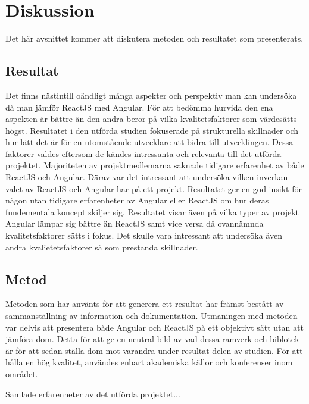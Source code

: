 \section{Diskussion}
\label{sec:axel-discussion}
Det här avsnittet kommer att diskutera metoden och resultatet som presenterats. 

\subsection{Resultat}
\label{subsec:axel-discussion-results}
Det finns nästintill oändligt många aspekter och perspektiv man kan undersöka då man jämför ReactJS med Angular. För att bedömma hurvida den ena aspekten är bättre än den andra beror på vilka kvalitetsfaktorer som värdesätts högst. Resultatet i den utförda studien fokuserade på strukturella skillnader och hur lätt det är för en utomstående utvecklare att bidra till utvecklingen. Dessa faktorer valdes eftersom de kändes intressanta och relevanta till det utförda projektet. Majoriteten av projektmedlemarna saknade tidigare erfarenhet av både ReactJS och Angular. Därav var det intressant att undersöka vilken inverkan valet av ReactJS och Angular har på ett projekt. Resultatet ger en god insikt för någon utan tidigare erfarenheter av Angular eller ReactJS om hur deras fundementala koncept skiljer sig. Resultatet visar även på vilka typer av projekt Angular lämpar sig bättre än ReactJS samt vice versa då ovannämnda kvalitetsfaktorer sätts i fokus. Det skulle vara intressant att undersöka även andra kvalietetsfaktorer så som prestanda skillnader. 

\subsection{Metod}
\label{subsec:axel-discussion-method}
Metoden som har använts för att generera ett resultat har främst bestått av sammanställning av information och dokumentation. Utmaningen med metoden var delvis att presentera både Angular och ReactJS på ett objektivt sätt utan att jämföra  dom. Detta för att ge en neutral bild av vad dessa ramverk och biblotek är för att sedan ställa dom mot varandra under resultat delen av studien. För att hålla en hög kvalitet, användes enbart akademiska källor och konferenser inom området.

Samlade erfarenheter av det utförda projektet...



